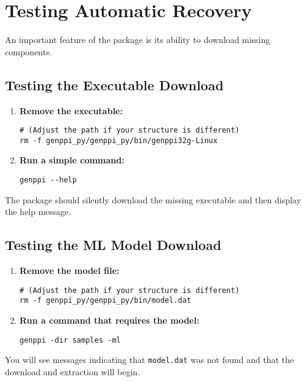 \documentclass[11pt, a4paper]{article}
\begin{document}
\section{Testing Automatic Recovery}
An important feature of the package is its ability to download missing components.

\subsection{Testing the Executable Download}
\begin{enumerate}
    \item \textbf{Remove the executable:}
    \begin{lstlisting}[style=bashstyle]
# (Adjust the path if your structure is different)
rm -f genppi_py/genppi_py/bin/genppi32g-Linux
    \end{lstlisting}
    \item \textbf{Run a simple command:}
    \begin{lstlisting}[style=bashstyle]
genppi --help
    \end{lstlisting}
\end{enumerate}
The package should silently download the missing executable and then display the help message.

\subsection{Testing the ML Model Download}
\begin{enumerate}
    \item \textbf{Remove the model file:}
    \begin{lstlisting}[style=bashstyle]
# (Adjust the path if your structure is different)
rm -f genppi_py/genppi_py/bin/model.dat
    \end{lstlisting}
    \item \textbf{Run a command that requires the model:}
    \begin{lstlisting}[style=bashstyle]
genppi -dir samples -ml
    \end{lstlisting}
\end{enumerate}
You will see messages indicating that \texttt{model.dat} was not found and that the download and extraction will begin.
\end{document}
